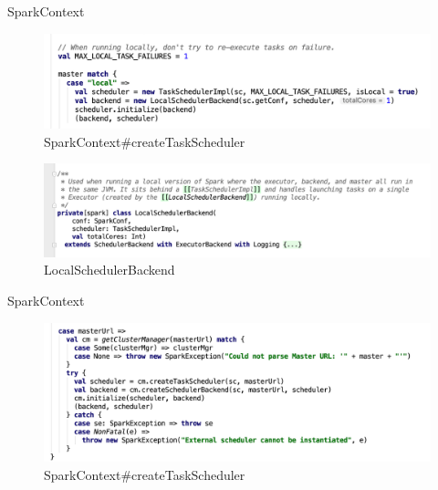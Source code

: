 \begin{frame}[plain,t]{SparkContext} %
	 \\ 
	\begin{figure}
		\centering
		\includegraphics[width=0.9\linewidth]{images/init007}
		\caption{SparkContext\#createTaskScheduler}
		\label{fig:init007}
	\end{figure}
	\begin{figure}
		\centering
		\includegraphics[width=1\linewidth]{images/init008}
		\caption{LocalSchedulerBackend}
		\label{fig:init008}
	\end{figure}
	
	
\end{frame}
\begin{frame}[plain,t]{SparkContext} %
	 \\  \vspace{2ex}
	\begin{figure}
		\centering
		\includegraphics[width=0.9\linewidth]{images/init003}
		\caption{SparkContext\#createTaskScheduler}
		\label{fig:init003}
	\end{figure}
	
\end{frame}
